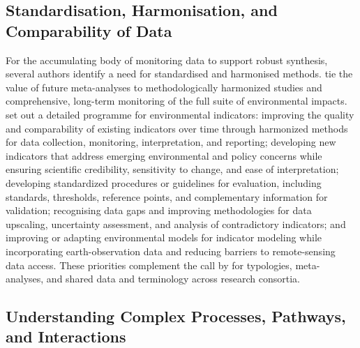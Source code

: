 \documentclass[11pt]{article}
\begin{document}
\subsection{Standardisation, Harmonisation, and Comparability of Data}

For the accumulating body of monitoring data to support robust synthesis, several authors identify a need for standardised and harmonised methods. \textcite{Wu2025} tie the value of future meta-analyses to methodologically harmonized studies and comprehensive, long-term monitoring of the full suite of environmental impacts. \textcite{Zhang2018} set out a detailed programme for environmental indicators: improving the quality and comparability of existing indicators over time through harmonized methods for data collection, monitoring, interpretation, and reporting; developing new indicators that address emerging environmental and policy concerns while ensuring scientific credibility, sensitivity to change, and ease of interpretation; developing standardized procedures or guidelines for evaluation, including standards, thresholds, reference points, and complementary information for validation; recognising data gaps and improving methodologies for data upscaling, uncertainty assessment, and analysis of contradictory indicators; and improving or adapting environmental models for indicator modeling while incorporating earth-observation data and reducing barriers to remote-sensing data access. These priorities complement the call by \textcite{Rogger2017} for typologies, meta-analyses, and shared data and terminology across research consortia.

\subsection{Understanding Complex Processes, Pathways, and Interactions}
\end{document}
